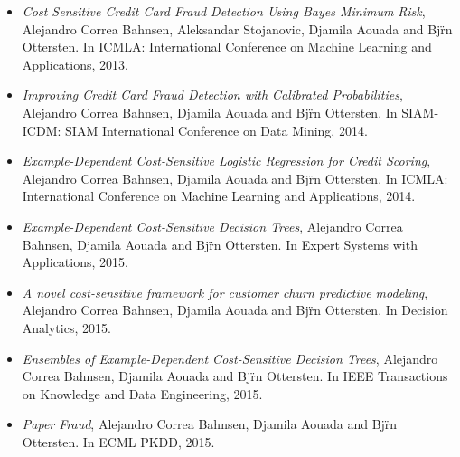 \begin{itemize}
\item \citep{CorreaBahnsen2013} \textit{Cost Sensitive Credit Card Fraud Detection Using Bayes 
Minimum Risk},
Alejandro Correa Bahnsen,  Aleksandar Stojanovic, Djamila Aouada and Bj\"rn Ottersten.
In ICMLA: International Conference on Machine Learning and Applications, 2013.

\item \citep{CorreaBahnsen2014} \textit{Improving Credit Card Fraud Detection with Calibrated 
Probabilities},
Alejandro Correa Bahnsen, Djamila Aouada and Bj\"rn Ottersten.
In SIAM-ICDM: SIAM International Conference on Data Mining, 2014.

\item \citep{CorreaBahnsen2014b} \textit{Example-Dependent Cost-Sensitive Logistic Regression for 
Credit Scoring},
Alejandro Correa Bahnsen, Djamila Aouada and Bj\"rn Ottersten.
In ICMLA: International Conference on Machine Learning and Applications, 2014.

\item \citep{CorreaBahnsen2015} \textit{Example-Dependent Cost-Sensitive Decision Trees},
Alejandro Correa Bahnsen, Djamila Aouada and Bj\"rn Ottersten.
In Expert Systems with Applications, 2015.

\item \citep{CorreaBahnsen2015a} \textit{A novel cost-sensitive framework for customer churn 
predictive modeling},
Alejandro Correa Bahnsen, Djamila Aouada and Bj\"rn Ottersten.
In Decision Analytics, 2015.

\item \citep{CorreaBahnsen2015b} \textit{Ensembles of Example-Dependent Cost-Sensitive Decision 
Trees},
Alejandro Correa Bahnsen, Djamila Aouada and Bj\"rn Ottersten.
In IEEE Transactions on Knowledge and Data Engineering, 2015.

\item \citep{CorreaBahnsen2015c} \textit{Paper Fraud},
Alejandro Correa Bahnsen, Djamila Aouada and Bj\"rn Ottersten.
In ECML PKDD, 2015.

\end{itemize}
